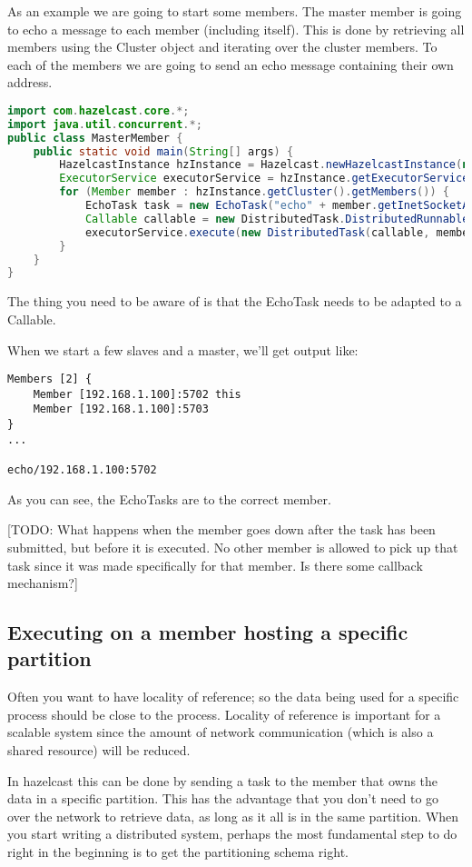As an example we are going to start some members. The master member is going to echo a message to each member (including itself). This is done by retrieving all members using the Cluster object and iterating over the cluster members. To each of the members we are going to send an echo message containing their own address. 
\begin{lstlisting}[language=java]
import com.hazelcast.core.*;
import java.util.concurrent.*;
public class MasterMember {
    public static void main(String[] args) {
        HazelcastInstance hzInstance = Hazelcast.newHazelcastInstance(null);
        ExecutorService executorService = hzInstance.getExecutorService();
        for (Member member : hzInstance.getCluster().getMembers()) {
            EchoTask task = new EchoTask("echo" + member.getInetSocketAddress());
            Callable callable = new DistributedTask.DistributedRunnableAdapterImpl(task, null);
            executorService.execute(new DistributedTask(callable, member));
        }
    }
}
\end{lstlisting}
The thing you need to be aware of is that the EchoTask needs to be adapted to a Callable. 

When we start a few slaves and a master, we'll get output like:
\begin{lstlisting}
Members [2] {
	Member [192.168.1.100]:5702 this
	Member [192.168.1.100]:5703
}
...

echo/192.168.1.100:5702
\end{lstlisting}
As you can see, the EchoTasks are to the correct member.

[TODO: What happens when the member goes down after the task has been submitted, but before it is executed. No other member is allowed to pick up that task since it was made specifically for that member. Is there some callback mechanism?]

\subsection{Executing on a member hosting a specific partition}
Often you want to have locality of reference; so the data being used for a specific process should be close to the process. Locality of reference is important for a scalable system since the amount of network communication (which is also a shared resource) will be reduced.

In hazelcast this can be done by sending a task to the member that owns the data in a specific partition. This has the advantage that you don't need to go over the network to retrieve data, as long as it all is in the same partition. When you start writing a distributed system, perhaps the most fundamental step to do right in the beginning is to get the partitioning schema right.

